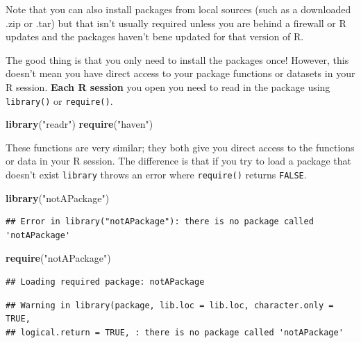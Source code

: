 \documentclass[
]{book}
\newenvironment{Shaded}{\begin{snugshade}}{\end{snugshade}}
\newcommand{\KeywordTok}[1]{\textcolor[rgb]{0.13,0.29,0.53}{\textbf{#1}}}
\newcommand{\NormalTok}[1]{#1}
\newcommand{\StringTok}[1]{\textcolor[rgb]{0.31,0.60,0.02}{#1}}
\theoremstyle{definition}
\theoremstyle{definition}
\theoremstyle{definition}
\theoremstyle{remark}
\begin{document}
Note that you can also install packages from local sources (such as a downloaded .zip or .tar) but that isn't usually required unless you are behind a firewall or R updates and the packages haven't bene updated for that version of R.

The good thing is that you only need to install the packages once! However, this doesn't mean you have direct access to your package functions or datasets in your R session. \textbf{Each R session} you open you need to read in the package using \texttt{library()} or \texttt{require()}.

\begin{Shaded}
\begin{Highlighting}[]
\KeywordTok{library}\NormalTok{(}\StringTok{"readr"}\NormalTok{)}
\KeywordTok{require}\NormalTok{(}\StringTok{"haven"}\NormalTok{)}
\end{Highlighting}
\end{Shaded}

These functions are very similar; they both give you direct access to the functions or data in your R session. The difference is that if you try to load a package that doesn't exist \texttt{library} throws an error where \texttt{require()} returns \texttt{FALSE}.

\begin{Shaded}
\begin{Highlighting}[]
\KeywordTok{library}\NormalTok{(}\StringTok{"notAPackage"}\NormalTok{)}
\end{Highlighting}
\end{Shaded}

\begin{verbatim}
## Error in library("notAPackage"): there is no package called 'notAPackage'
\end{verbatim}

\begin{Shaded}
\begin{Highlighting}[]
\KeywordTok{require}\NormalTok{(}\StringTok{"notAPackage"}\NormalTok{)}
\end{Highlighting}
\end{Shaded}

\begin{verbatim}
## Loading required package: notAPackage
\end{verbatim}

\begin{verbatim}
## Warning in library(package, lib.loc = lib.loc, character.only = TRUE,
## logical.return = TRUE, : there is no package called 'notAPackage'
\end{verbatim}
\end{document}
